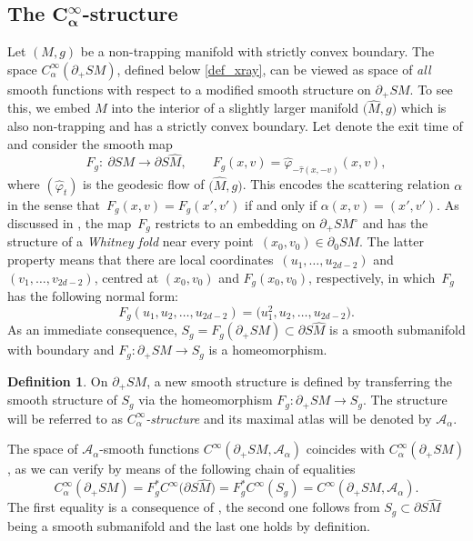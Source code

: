 \documentclass[pdftex]{sigma}
\numberwithin{equation}{section}
\theoremstyle{definition}
\newtheorem{Definition}[Theorem]{Definition}
\newcommand{\1}{{\bf 1}}
\begin{document}
\subsection[The C\_alpha\^{}infty-structure]{The $\boldsymbol{C_\alpha^\infty}$-structure}\label{s_calpha}

Let $(M,g)$ be a non-trapping manifold with strictly convex boundary. The space $C_\alpha^\infty(\partial_+SM)$, defined below \eqref{def_xray}, can be viewed as space of {\it all} smooth functions with respect to a modified smooth structure on $\partial_+SM$.
To see this, we embed $M$ into the interior of a slightly larger manifold $\bigl(\hat M,g\bigr)$ which is also non-trapping and has a strictly convex boundary. Let \smash{$\hat \tau \in C^\infty(SM,[0,\infty))$} denote the exit time of  and consider the smooth map
\begin{equation}\label{def_foldmap}
	F_g\colon \ \partial SM\rightarrow \partial S\hat M,\qquad F_g(x,v) = \hat \varphi_{-\hat \tau(x,-v)}(x,v),
\end{equation}
where $(\hat \varphi_t)$ is the geodesic flow of $\bigl(\hat M,g\bigr)$. This encodes the scattering relation $\alpha$ in the sense that~${F_g(x,v)=F_g(x',v')}$ if and only if $\alpha(x,v)=(x',v')$.
 As discussed in \cite[Section~5.2]{PSU23}, the map~$F_g$ restricts to an embedding on $\partial_+SM^\circ$ and has the structure of a {\it Whitney fold} near every point~$(x_0,v_0)\in \partial_0SM$. The latter property means that there are local coordinates~${(u_1,\dots, u_{2d-2})}$ and~$(v_1,\dots, v_{2d-2})$, centred at $(x_0,v_0)$ and $F_g(x_0,v_0)$, respectively, in which~$F_g$ has the following normal form:
\begin{equation}\label{whitneynormalform}
	F_g(u_1,u_2,\dots, u_{2d-2}) = \bigl(u_1^2,u_2,\dots, u_{2d-2}\bigr).
\end{equation}
As an immediate consequence, $S_g=F_g(\partial_+SM)\subset \partial S\hat M$ is a smooth submanifold with boundary and $F_g\colon \partial_+SM\rightarrow S_g$ is a homeomorphism.

\begin{Definition}
	On $\partial_+SM$, a new smooth structure is defined by transferring the smooth structure of $S_g$ via the homeomorphism $F_g\colon \partial_+SM\rightarrow S_g$. The structure will be referred to as {\it $C_\alpha^\infty$-structure} and its maximal atlas will be denoted by $\mathcal A_\alpha$.
\end{Definition}

The space of $\mathcal A_\alpha$-smooth functions $C^\infty(\partial_+SM,\mathcal A_\alpha)$ coincides with $C^\infty_\alpha(\partial_+SM)$, as we can verify by means of the following chain of equalities
\[
	C_\alpha^\infty(\partial_+SM) =F_g^*C^\infty\bigl(\partial S\hat M\bigr) = F_g^*C^\infty(S_g) = C^\infty(\partial_+SM,\mathcal A_\alpha).
\]
The first equality is a consequence of \cite[Theorem~C.4.4]{Hor07}, the second one follows from $S_g\subset \partial S \hat M$ being a smooth submanifold and the last one holds by definition.
\end{document}
